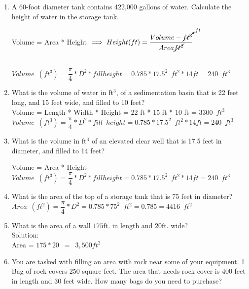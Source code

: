 \begin{enumerate}[1.]
\item A 60-foot diameter tank contains 422,000 gallons of water. Calculate the height of water in the storage tank.

Volume = Area * Height $\implies Height (ft) =\dfrac{Volume - \cancelto{ft}{ft^3}}{Area \cancel{ft^2}}$\\
\vspace{0.2cm}
\

$ Volume \enspace (ft^3) = \dfrac{\pi}{4}*D^2 * fill height = 0.785*17.5^2 \enspace ft^2 * 14 ft=\boxed{240\enspace ft^3}$


\item What is the volume of water in ft$^3$, of a sedimentation basin that is 22 feet long, and 15 feet wide, and filled to 10 feet?\\

Volume = Length * Width * Height = 22 ft * 15 ft * 10 ft = $\boxed{3300 \enspace ft^3}$\\
\vspace{0.2cm}
$ Volume \enspace (ft^3) = \dfrac{\pi}{4}*D^2 * fill \enspace height = 0.785*17.5^2 \enspace ft^2 * 14 ft=\boxed{240\enspace ft^3}$

\item What is the volume in ft$^3$ of an elevated clear well that is 17.5 feet in diameter, and filled to 14 feet?

Volume = Area * Height\\
\vspace{0.2cm}
$ Volume \enspace (ft^3) = \dfrac{\pi}{4}*D^2 * fill height = 0.785*17.5^2 \enspace ft^2 * 14 ft=\boxed{240\enspace ft^3}$

\item What is the area of the top of a storage tank that is 75 feet in diameter?\\

$Area \enspace (ft^2)= \dfrac{\pi}{4}*D^2= 0.785*75^2 \enspace ft^2=0.785 = \boxed{4416\enspace ft^2}$\\
\vspace{0.2cm}

\item  What is the area of a wall $175 \mathrm{ft}$. in length and $20 \mathrm{ft}$. wide?\\
\vspace{0.2cm}
Solution:\\
\vspace{0.2cm}
Area = $175 * 20 \enspace = \enspace \boxed{3,500 ft^2}$
\vspace{0.2cm}
\item  You are tasked with filling an area with rock near some of your equipment. 1 Bag of rock covers 250 square feet. The area that needs rock cover is 400 feet in length and 30 feet wide. How many bags do you need to purchase?\\


\end{enumerate}
